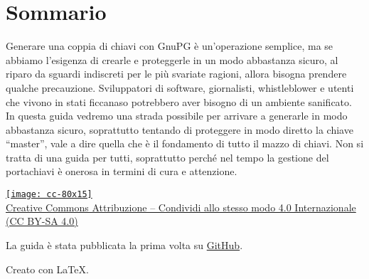 \thispagestyle{empty}
\begingroup
	\section*{Sommario}

	Generare una coppia di chiavi con GnuPG è un’operazione semplice, ma se
	abbiamo l’esigenza di crearle e proteggerle in un modo abbastanza sicuro, al
	riparo da sguardi indiscreti per le più svariate ragioni, allora bisogna
	prendere qualche precauzione. Sviluppatori di software, giornalisti,
	whistleblower e utenti che vivono in stati ficcanaso potrebbero aver bisogno
	di un ambiente sanificato. In questa guida vedremo una strada possibile per
	arrivare a generarle in modo abbastanza sicuro, soprattutto tentando di
	proteggere in modo diretto la chiave “master”, vale a dire quella che è il
	fondamento di tutto il mazzo di chiavi. Non si tratta di una guida per
	tutti, soprattutto perché nel tempo la gestione del portachiavi è onerosa in
	termini di cura e attenzione.\bigskip

	\vfill

	\footnotesize

	\noindent\href{https://creativecommons.org/licenses/by-sa/4.0/deed.it}{\texttt{[image: cc-80x15]}\\
	Creative Commons Attribuzione -- Condividi allo stesso modo 4.0
	Internazionale (CC BY-SA 4.0)}\bigskip

	\noindent La guida è stata pubblicata la prima volta su
	\href{https://github.com/aldolat/generazione-sicura-chiavi-openpgp}{GitHub}.\bigskip

	\noindent Creato con \LaTeX.

\endgroup